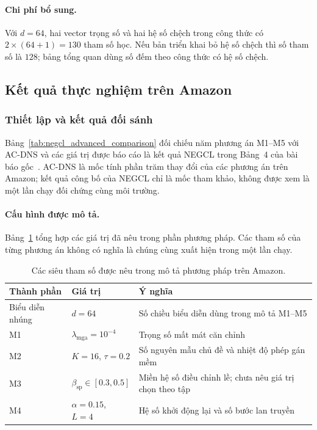 \paragraph{Chi phí bổ sung.}
Với $d=64$, hai vector trọng số và hai hệ số chệch trong công thức có $2\times(64+1)=130$ tham số học. Nếu bản triển khai bỏ hệ số chệch thì số tham số là $128$; bảng tổng quan dùng số đếm theo công thức có hệ số chệch.

\subsection{Kết quả thực nghiệm trên Amazon}
\label{sec:negcl_advanced_experiments}

\subsubsection{Thiết lập và kết quả đối sánh}


Bảng~\ref{tab:negcl_advanced_comparison} đối chiếu năm phương án M1--M5 với AC-DNS và các giá trị được báo cáo là kết quả NEGCL trong Bảng~4 của bài báo gốc~\cite{shi2025negcl}. AC-DNS là mốc tính phần trăm thay đổi của các phương án trên Amazon; kết quả công bố của NEGCL chỉ là mốc tham khảo, không được xem là một lần chạy đối chứng cùng môi trường.

\paragraph{Cấu hình được mô tả.}
Bảng~\ref{tab:negcl_settings} tổng hợp các giá trị đã nêu trong phần phương pháp. Các tham số của từng phương án không có nghĩa là chúng cùng xuất hiện trong một lần chạy.
\begin{table}[H]
\centering
\renewcommand{\baselinestretch}{1}
\small
\setlength{\tabcolsep}{4pt}
\caption{Các siêu tham số được nêu trong mô tả phương pháp trên Amazon.}
\label{tab:negcl_settings}
\begin{tabular}{@{}>{\raggedright\arraybackslash}p{3cm}>{\centering\arraybackslash}p{2.5cm}>{\raggedright\arraybackslash}p{\dimexpr\linewidth-5.5cm-4\tabcolsep\relax}@{}}
\toprule
\textbf{Thành phần} & \textbf{Giá trị} & \textbf{Ý nghĩa} \\
\midrule
Biểu diễn nhúng & $d=64$ & Số chiều biểu diễn dùng trong mô tả M1--M5 \\
M1 & $\lambda_{\text{mga}}=10^{-4}$ & Trọng số mất mát căn chỉnh \\
M2 & $K=16$, $\tau=0.2$ & Số nguyên mẫu chủ đề và nhiệt độ phép gán mềm \\
M3 & $\beta_{\text{sp}}\in[0.3,0.5]$ & Miền hệ số điều chỉnh lề; chưa nêu giá trị chọn theo tập \\
M4 & $\alpha=0.15$, $L=4$ & Hệ số khởi động lại và số bước lan truyền \\
\bottomrule
\end{tabular}
\end{table}

